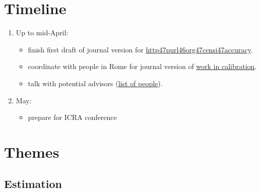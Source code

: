 \documentclass{article}
\begin{document}
 
\hypertarget{timeline}{}\section*{{Timeline}}\label{timeline}

\begin{enumerate}%
\item Up to mid-April:

\begin{itemize}%
\item finish first draft of journal version for \href{http://purl.org/censi/2006/accuracy}{http\char47purl\char46org\char47censi\char47accuracy}.
\item coordinate with people in Rome for journal version of \href{http://purl.org/censi/2007/calib}{work in calibration}.
\item talk with potential advisors (\href{http://www.cds.caltech.edu/~andrea/blog/2008-02-21}{list of people}).

\end{itemize}

\item May:

\begin{itemize}%
\item prepare for ICRA conference

\end{itemize}


\end{enumerate}
\hypertarget{themes}{}\section*{{Themes}}\label{themes}

\hypertarget{estimation}{}\subsection*{{Estimation}}\label{estimation}
\end{document}
